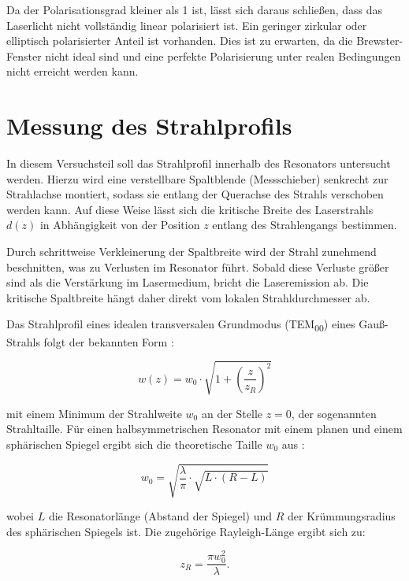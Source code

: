 Da der Polarisationsgrad kleiner als 1 ist, lässt sich daraus schließen, dass das Laserlicht nicht vollständig linear polarisiert ist. 
Ein geringer zirkular oder elliptisch polarisierter Anteil ist vorhanden. 
Dies ist zu erwarten, da die Brewster-Fenster nicht ideal sind und eine perfekte Polarisierung unter realen Bedingungen nicht erreicht werden kann.

\chapter{Messung des Strahlprofils}

In diesem Versuchsteil soll das Strahlprofil innerhalb des Resonators untersucht werden. 
Hierzu wird eine verstellbare Spaltblende (Messschieber) senkrecht zur Strahlachse montiert, sodass sie entlang der Querachse des Strahls verschoben werden kann. 
Auf diese Weise lässt sich die kritische Breite des Laserstrahls \( d(z) \) in Abhängigkeit von der Position \( z \) entlang des Strahlengangs bestimmen.

Durch schrittweise Verkleinerung der Spaltbreite wird der Strahl zunehmend beschnitten, was zu Verlusten im Resonator führt. 
Sobald diese Verluste größer sind als die Verstärkung im Lasermedium, bricht die Laseremission ab. 
Die kritische Spaltbreite hängt daher direkt vom lokalen Strahldurchmesser ab.

Das Strahlprofil eines idealen transversalen Grundmodus (TEM\textsubscript{00}) eines Gauß-Strahls folgt der bekannten Form \cite{praktikum} :

\begin{equation*}
    w(z) = w_0 \cdot \sqrt{1+\left(\frac{z}{z_R}\right)^2}
\end{equation*}
 
mit einem Minimum der Strahlweite \( w_0 \) an der Stelle \( z = 0 \), der sogenannten Strahltaille. Für einen halbsymmetrischen Resonator mit einem planen und einem sphärischen Spiegel ergibt sich die theoretische Taille \( w_0 \) aus \cite{praktikum}:

\begin{equation*}
    w_0 = \sqrt{\frac{\lambda}{\pi} \cdot \sqrt{L \cdot (R - L)}}
\end{equation*}

wobei \( L \) die Resonatorlänge (Abstand der Spiegel) und \( R \) der Krümmungsradius des sphärischen Spiegels ist. Die zugehörige Rayleigh-Länge ergibt sich zu:

\begin{equation*}
    z_R = \frac{\pi w_0^2}{\lambda}.
\end{equation*}

